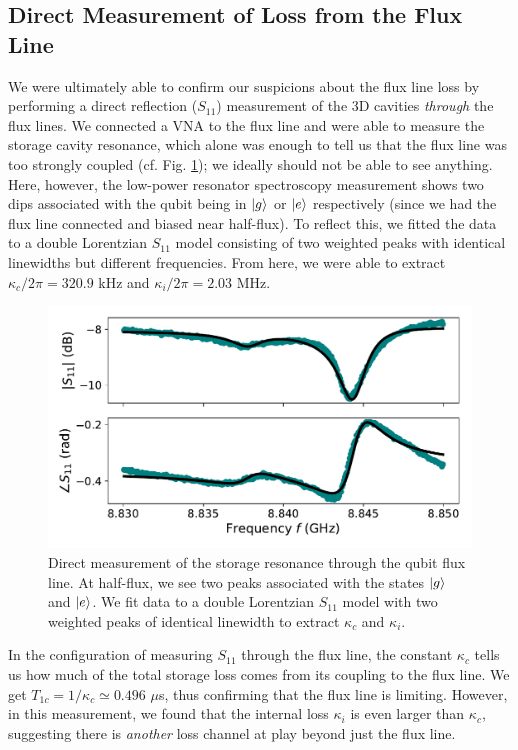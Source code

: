 \subsection{Direct Measurement of Loss from the Flux Line}

We were ultimately able to confirm our suspicions about the flux line loss by performing a direct reflection ($S_{11}$) measurement of the 3D cavities \textit{through} the flux lines. We connected a VNA to the flux line and were able to measure the storage cavity resonance, which alone was enough to tell us that the flux line was too strongly coupled (cf. Fig. \ref{fig:4_storage_loss_thru_flux_line}); we ideally should not be able to see anything. Here, however, the low-power resonator spectroscopy measurement shows two dips associated with the qubit being in $\lvert g\rangle$ or $\lvert e\rangle$ respectively (since we had the flux line connected and biased near half-flux). To reflect this, we fitted the data to a double Lorentzian $S_{11}$ model consisting of two weighted peaks with identical linewidths but different frequencies. From here, we were able to extract $\kappa_c/2\pi = 320.9$ kHz and $\kappa_i/2\pi = 2.03$ MHz. 

\begin{figure}[h]
    \centering
    \includegraphics[width=0.7\linewidth]{Figures/4/storage_loss_thru_flux_line.pdf}
    \caption[Direct measurement of the storage resonator through the qubit flux line.]{Direct measurement of the storage resonance through the qubit flux line. At half-flux, we see two peaks associated with the states $\lvert g\rangle$ and $\lvert e\rangle$. We fit data to a double Lorentzian $S_{11}$ model with two weighted peaks of identical linewidth to extract $\kappa_c$ and $\kappa_i$.}
    \label{fig:4_storage_loss_thru_flux_line}
\end{figure}

In the configuration of measuring $S_{11}$ through the flux line, the constant $\kappa_c$ tells us how much of the total storage loss comes from its coupling to the flux line. We get $T_{1c} = 1/\kappa_c \simeq 0.496$ $\mu$s, thus confirming that the flux line is limiting. However, in this measurement, we found that the internal loss $\kappa_i$ is even larger than $\kappa_c$, suggesting there is \textit{another} loss channel at play beyond just the flux line. 

